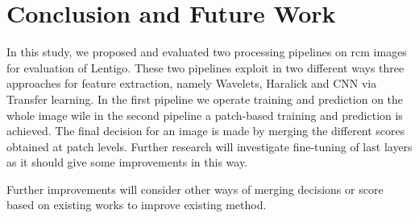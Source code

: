 \section{Conclusion and Future Work}
\label{conclusion}
In this study, we proposed and evaluated two processing pipelines on \ac{rcm} images for evaluation of Lentigo. These two pipelines exploit in two different ways three approaches for feature extraction, namely Wavelets, Haralick and CNN via Transfer learning. In the first pipeline we operate training and prediction on the whole image wile in the second pipeline a patch-based training and prediction is achieved. The final decision for an image is made by merging the different scores obtained at patch levels. Further research will investigate fine-tuning of last layers as it should give some improvements in this way.\par
Further improvements will consider other ways of merging decisions or score based on existing works to improve existing method.\par